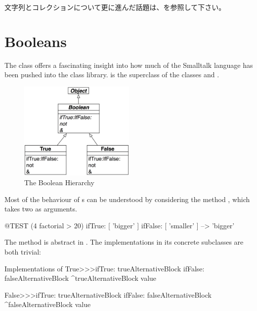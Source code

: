 \documentclass[a4paper,10pt,twoside]{book}
\begin{document}
文字列とコレクションについて更に進んだ話題は、を参照して下さい。


\section{Booleans}

The class  offers a fascinating insight into how much of the Smalltalk language has been pushed into the class library.  is the  superclass of the  classes  and .

\begin{figure}[ht]
  {\centerline {\includegraphics[width=0.5\textwidth]{BooleanHierarchy}}}
\caption{The Boolean Hierarchy }
\end{figure}

Most of the behaviour of s can be understood by considering the method , which takes two  as arguments.

\begin{code}{@TEST}
(4 factorial > 20) ifTrue: [ 'bigger' ] ifFalse: [ 'smaller' ] --> 'bigger'
\end{code}

The method is abstract in .
The implementations in its concrete subclasses are both trivial:

\begin{method}{Implementations of }
True>>>ifTrue: trueAlternativeBlock ifFalse: falseAlternativeBlock 
    ^trueAlternativeBlock value

False>>>ifTrue: trueAlternativeBlock ifFalse: falseAlternativeBlock 
    ^falseAlternativeBlock value
\end{method}
\end{document}
